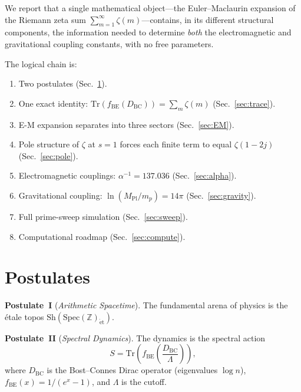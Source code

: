 \documentclass[aps,prd,twocolumn,superscriptaddress,nofootinbib]{revtex4-2}
\newcommand{\Spec}{\mathrm{Spec}}
\newcommand{\Tr}{\mathrm{Tr}}
\newcommand{\Sh}{\mathrm{Sh}}
\begin{document}
We report that a single mathematical object---the
Euler--Maclaurin expansion of the Riemann zeta sum
$\sum_{m=1}^\infty\zeta(m)$---contains, in its different structural
components, the information needed to determine \emph{both} the
electromagnetic and gravitational coupling constants, with no free
parameters.

The logical chain is:
\begin{enumerate}
\item Two postulates (Sec.~\ref{sec:postulates}).
\item One exact identity: $\Tr(f_{\mathrm{BE}}(D_{\mathrm{BC}}))=
\sum_m\zeta(m)$ (Sec.~\ref{sec:trace}).
\item E-M expansion separates into three sectors
(Sec.~\ref{sec:EM}).
\item Pole structure of $\zeta$ at $s=1$ forces each finite term to
equal $\zeta(1{-}2j)$ (Sec.~\ref{sec:pole}).
\item Electromagnetic couplings: $\alpha^{-1}=137.036$
(Sec.~\ref{sec:alpha}).
\item Gravitational coupling: $\ln(M_{\mathrm{Pl}}/m_p)=14\pi$
(Sec.~\ref{sec:gravity}).
\item Full prime-sweep simulation (Sec.~\ref{sec:sweep}).
\item Computational roadmap (Sec.~\ref{sec:compute}).
\end{enumerate}

\section{Postulates}\label{sec:postulates}

\noindent\textbf{Postulate~I} (\emph{Arithmetic Spacetime}).
The fundamental arena of physics is the \'etale topos
$\Sh(\Spec(\mathbb{Z})_{\mathrm{\acute{e}t}})$.

\medskip
\noindent\textbf{Postulate~II} (\emph{Spectral Dynamics}).
The dynamics is the spectral action
\begin{equation}\label{eq:master}
  S = \Tr\!\left(f_{\mathrm{BE}}\!\left(
  \frac{D_{\mathrm{BC}}}{\Lambda}\right)\right),
\end{equation}
where $D_{\mathrm{BC}}$ is the Bost--Connes Dirac operator
(eigenvalues $\log n$), $f_{\mathrm{BE}}(x)=1/(e^x-1)$, and
$\Lambda$ is the cutoff.

\end{document}
